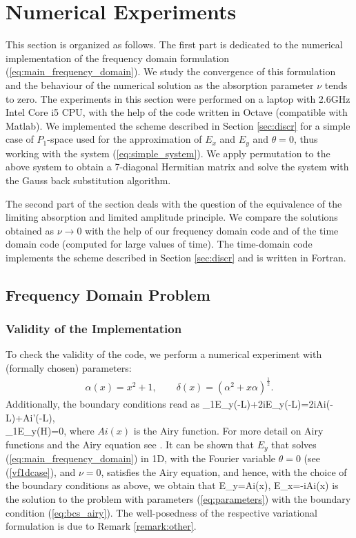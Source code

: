 
\section{Numerical Experiments}
This section is organized as follows. The first part is dedicated to the numerical implementation
of the frequency domain formulation (\ref{eq:main_frequency_domain}). We study the convergence of this formulation and the behaviour 
of the numerical solution as the absorption parameter $\nu$ tends to zero. The experiments in this section were 
performed on a laptop with 2.6GHz Intel Core i5 CPU, with the help of the code written in Octave (compatible with Matlab). 
We implemented the scheme described in Section \ref{sec:discr} for a simple case of $P_{1}$-space used 
for the approximation of $E_{x}$ and $E_{y}$ and $\theta=0$, thus working with the system (\ref{eq:simple_system}). 
We apply permutation to the above system 
to obtain a 7-diagonal Hermitian matrix and solve the system with the Gauss back substitution algorithm. 

The second part of the section deals with the question of the equivalence of the limiting absorption and limited amplitude 
principle. We compare the solutions obtained as $\nu\rightarrow 0$ with the help of our frequency domain code 
and of the time domain code (computed for large values of time). 
The time-domain code implements the scheme described in Section \ref{sec:discr} and 
is written in Fortran. 
\subsection{Frequency Domain Problem}
\label{sec:freq_dep}
\subsubsection{Validity of the Implementation}
To check the validity of the code, we perform a numerical experiment with (formally chosen) parameters:
\begin{align}
\label{eq:parameters}
\alpha(x)=x^2+1,\qquad \delta(x)=\left(\alpha^2+x\alpha\right)^{\frac{1}{2}}.
\end{align}
Additionally, the boundary conditions read as 
\bealn
\label{eq:bcs_airy}
\partial_{1}E_{y}(-L)+2iE_{y}(-L)=2iAi(-L)+Ai'(-L),\\
\partial_{1}E_{y}(H)=0,
\eealn
where $Ai(x)$ is the Airy function. 
For more detail on Airy functions and the Airy equation see \cite[Chapter 10.4]{abramowitz_stegun}. 
It can be shown that $E_{y}$ that solves (\ref{eq:main_frequency_domain}) in 1D, with the Fourier variable $\theta=0$ (see (\ref{vf1dcase}), and $\nu=0$, 
satisfies the Airy equation, and hence, 
with the choice of the boundary conditions as above, we obtain that 
\bealn
E_{y}=Ai(x),\qquad 
E_{x}=-iAi(x)
\eealn
is the solution to the problem with parameters (\ref{eq:parameters}) with the boundary condition (\ref{eq:bcs_airy}). 
The well-posedness of the respective variational formulation is due to Remark \ref{remark:other}. 

